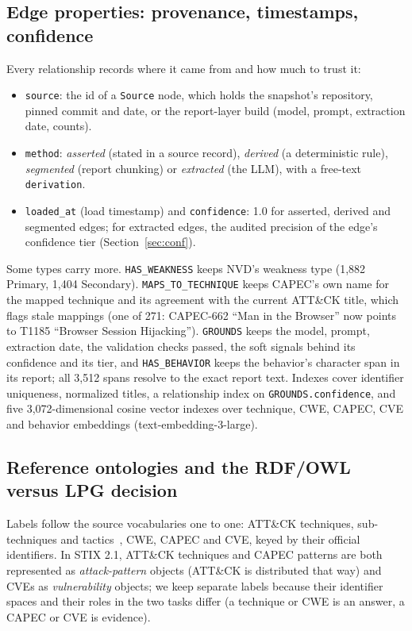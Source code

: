 \documentclass[conference]{IEEEtran}
\begin{document}
\subsection{Edge properties: provenance, timestamps, confidence}\label{sec:props}

Every relationship records where it came from and how much to trust it:
\begin{itemize}
\item \texttt{source}: the id of a \texttt{Source} node, which holds the snapshot's repository, pinned commit and date, or the report-layer build (model, prompt, extraction date, counts).
\item \texttt{method}: \emph{asserted} (stated in a source record), \emph{derived} (a deterministic rule), \emph{segmented} (report chunking) or \emph{extracted} (the LLM), with a free-text \texttt{derivation}.
\item \texttt{loaded\_at} (load timestamp) and \texttt{confidence}: 1.0 for asserted, derived and segmented edges; for extracted edges, the audited precision of the edge's confidence tier (Section~\ref{sec:conf}).
\end{itemize}
Some types carry more. \texttt{HAS\_WEAKNESS} keeps NVD's weakness type (1,882 Primary, 1,404 Secondary). \texttt{MAPS\_TO\_TECHNIQUE} keeps CAPEC's own name for the mapped technique and its agreement with the current ATT\&CK title, which flags stale mappings (one of 271: CAPEC-662 ``Man in the Browser'' now points to T1185 ``Browser Session Hijacking''). \texttt{GROUNDS} keeps the model, prompt, extraction date, the validation checks passed, the soft signals behind its confidence and its tier, and \texttt{HAS\_BEHAVIOR} keeps the behavior's character span in its report; all 3,512 spans resolve to the exact report text. Indexes cover identifier uniqueness, normalized titles, a relationship index on \texttt{GROUNDS.confidence}, and five 3,072-dimensional cosine vector indexes over technique, CWE, CAPEC, CVE and behavior embeddings (text-embedding-3-large).

\subsection{Reference ontologies and the RDF/OWL versus LPG decision}

Labels follow the source vocabularies one to one: ATT\&CK techniques, sub-techniques and tactics~\cite{attack}, CWE, CAPEC and CVE, keyed by their official identifiers. In STIX 2.1, ATT\&CK techniques and CAPEC patterns are both represented as \emph{attack-pattern} objects (ATT\&CK is distributed that way) and CVEs as \emph{vulnerability} objects; we keep separate labels because their identifier spaces and their roles in the two tasks differ (a technique or CWE is an answer, a CAPEC or CVE is evidence).
\end{document}
